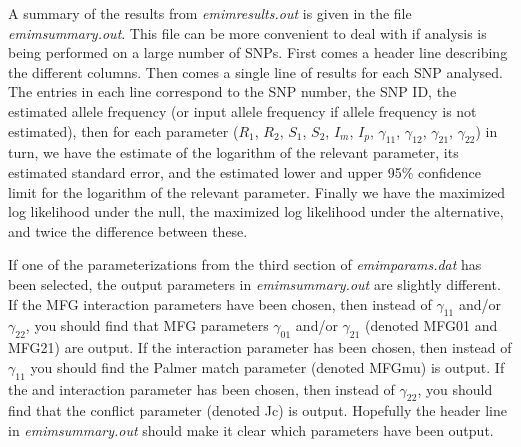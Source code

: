 \documentclass[a4paper,11pt]{report}
\begin{document}
A summary of the results from {\it emimresults.out} is given in the file
{\it emimsummary.out}. This file can be more convenient to deal with
if analysis is being performed on a large number of SNPs. First comes a header line describing the different columns. Then comes a single line of results
for each SNP analysed. The entries in each line correspond to the SNP number, the SNP ID, the estimated allele 
frequency (or input allele frequency if allele 
frequency is not estimated), then for each 
parameter ($R_1$, $R_2$, $S_1$, $S_2$, $I_m$, $I_p$, $\gamma_{11}$, $\gamma_{12}$, $\gamma_{21}$, $\gamma_{22}$) in turn,
we have the estimate of the logarithm of the relevant parameter,
its estimated standard error, and the estimated
 lower and upper 95\% confidence limit for the logarithm of the relevant parameter.
Finally we have the maximized log likelihood under the null,  the maximized log likelihood under the alternative, and  twice the difference between these.

If one of the parameterizations from the third section of {\it emimparams.dat} has been selected,
the output parameters in {\it emimsummary.out} are slightly different.
If the \citet{sinsheimer:etal:03}
MFG interaction parameters have been chosen, then
instead of $\gamma_{11}$ and/or $\gamma_{22}$, you should find that MFG parameters
$\gamma_{01}$ and/or $\gamma_{21}$ (denoted MFG01 and MFG21)
are output. 
If the \citet{palmer:etal:06} interaction parameter has been chosen, then
instead of $\gamma_{11}$ you should find the Palmer match parameter (denoted MFGmu)
is output. 
If the  \citet{li:etal:09} and \citet{parimi:etal:08} interaction parameter has been chosen, then
instead of $\gamma_{22}$, you should find that the \citet{li:etal:09}
conflict parameter (denoted Jc)
is output. 
Hopefully the header line in {\it emimsummary.out} should make it clear which parameters have been output.




\clearpage



\end{document}
